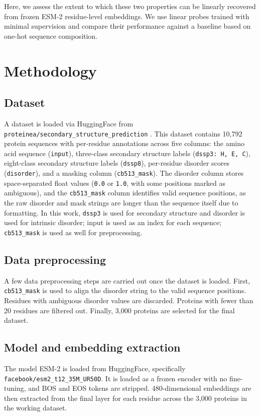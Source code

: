 \documentclass[12pt, letterpaper]{article}
\begin{document}
Here, we assess the extent to which these two properties can be linearly recovered from frozen ESM-2 residue-level embeddings. We use linear probes trained with minimal supervision and compare their performance against a baseline based on one-hot sequence composition.



\section{Methodology}

\subsection{Dataset}
A dataset is loaded via HuggingFace from \texttt{proteinea/secondary\_structure\_prediction} \citet{proteinea_ssp}. This dataset contains 10,792 protein sequences with per-residue annotations across five columns: the amino acid sequence (\texttt{input}), three-class secondary structure labels (\texttt{dssp3: H, E, C}), eight-class secondary structure labels (\texttt{dssp8}), per-residue disorder scores (\texttt{disorder}), and a masking column (\texttt{cb513\_mask}). The disorder column stores space-separated float values (\texttt{0.0} or \texttt{1.0}, with some positions marked as ambiguous), and the \texttt{cb513\_mask} column identifies valid sequence positions, as the raw disorder and mask strings are longer than the sequence itself due to formatting. In this work, \texttt{dssp3} is used for secondary structure and disorder is used for intrinsic disorder; input is used as an index for each sequence; \texttt{cb513\_mask} is used as well for preprocessing.

\subsection{Data preprocessing}
A few data preprocessing steps are carried out once the dataset is loaded. First, \texttt{cb513\_mask} is used to align the disorder string to the valid sequence positions. Residues with ambiguous disorder values are discarded. Proteins with fewer than 20 residues are filtered out. Finally, 3,000 proteins are selected for the final dataset.

\subsection{Model and embedding extraction}
The model ESM-2 is loaded from HuggingFace, specifically \texttt{facebook/esm2\_t12\_35M\_UR50D}. It is loaded as a frozen encoder with no fine-tuning, and BOS and EOS tokens are stripped. 480-dimensional embeddings are then extracted from the final layer for each residue across the 3,000 proteins in the working dataset.
\end{document}

